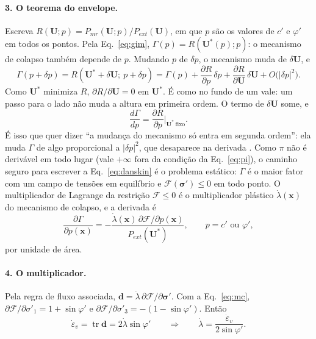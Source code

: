 \documentclass[11pt,a4paper]{article}
\newcommand{\Fy}{\mathcal{F}}
\begin{document}
\paragraph{3. O teorema do envelope.} Escreva $R(\bm U; p) = P_{mr}(\bm U; p)/P_{ext}(\bm U)$, em que $p$ são os
valores de $c'$ e $\varphi'$ em todos os pontos. Pela Eq.~\eqref{eq:gim}, $\Gamma(p) = R(\bm U^*(p); p)$: o mecanismo de
colapso também depende de $p$. Mudando $p$ de $\delta p$, o mecanismo muda de $\delta\bm U$, e
\begin{equation}
  \Gamma(p + \delta p) = R(\bm U^* + \delta\bm U;\ p + \delta p)
  = \Gamma(p) + \frac{\partial R}{\partial p}\,\delta p + \frac{\partial R}{\partial\bm U}\,\delta\bm U
  + O\big(|\delta p|^2\big).
  \label{eq:taylor}
\end{equation}
Como $\bm U^*$ minimiza $R$, $\partial R/\partial\bm U = 0$ em $\bm U^*$. É como no fundo de um vale: um passo para o
lado não muda a altura em primeira ordem. O termo de $\delta\bm U$ some, e
\begin{equation}
  \frac{d\Gamma}{dp} = \frac{\partial R}{\partial p}\Big|_{\bm U^*\ \text{fixo}}.
  \label{eq:danskin}
\end{equation}
É isso que quer dizer ``a mudança do mecanismo só entra em segunda ordem'': ela muda $\Gamma$ de algo proporcional a
$|\delta p|^2$, que desaparece na derivada \citep{danskin1967}. Como $\pi$ não é derivável em todo lugar (vale
$+\infty$ fora da condição da Eq.~\ref{eq:pi}), o caminho seguro para escrever a Eq.~\eqref{eq:danskin} é o problema
estático: $\Gamma$ é o maior fator com um campo de tensões em equilíbrio e $\Fy(\bm\sigma') \le 0$ em todo ponto. O
multiplicador de Lagrange da restrição $\Fy \le 0$ é o multiplicador plástico $\dot\lambda(\bm x)$ do mecanismo de
colapso, e a derivada é
\begin{equation}
  \frac{\partial\Gamma}{\partial p(\bm x)} = -\frac{\dot\lambda(\bm x)\,\partial\Fy/\partial p(\bm x)}{P_{ext}(\bm U^*)},
  \qquad p = c' \text{ ou } \varphi',
  \label{eq:envelope}
\end{equation}
por unidade de área.

\paragraph{4. O multiplicador.} Pela regra de fluxo associada, $\bm d = \dot\lambda\,\partial\Fy/\partial\bm\sigma'$.
Com a Eq.~\eqref{eq:mc}, $\partial\Fy/\partial\sigma'_1 = 1 + \sin\varphi'$ e
$\partial\Fy/\partial\sigma'_3 = -(1 - \sin\varphi')$. Então
\begin{equation}
  \dot\varepsilon_v = \operatorname{tr}\bm d = 2\dot\lambda\sin\varphi'
  \qquad\Longrightarrow\qquad \dot\lambda = \frac{\dot\varepsilon_v}{2\sin\varphi'}.
  \label{eq:fluxo}
\end{equation}
\end{document}

